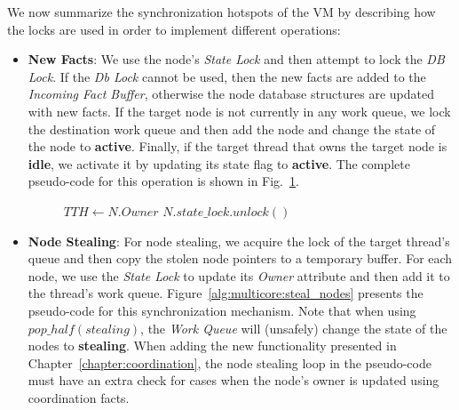 
We now summarize the synchronization hotspots of the VM by describing how the locks
are used in order to implement different operations:

\begin{itemize}

   \item \textbf{New Facts}: We use the node's \emph{State Lock} and then attempt
      to lock the \emph{DB Lock}. If the \emph{Db Lock} cannot be used, then the
      new facts are added to the \emph{Incoming Fact Buffer}, otherwise the node database
      structures are updated with new facts. If the target node is not currently
      in any work queue, we lock the destination work queue and then add the
      node and change the state of the node to \textbf{active}. Finally, if the
      target thread that owns the target node is \textbf{idle}, we activate it
      by updating its state flag to \textbf{active}. The complete pseudo-code
      for this operation is shown in Fig.~\ref{alg:multicore:new_fact}.

\begin{figure}
\begin{algorithm}[H]
   $TTH \longleftarrow N.Owner$\;
   $N.state\_lock.unlock()$\;
\end{algorithm}
 \label{alg:multicore:new_fact}
\end{figure}


   \item \textbf{Node Stealing}: For node stealing, we acquire the lock of the
      target thread's queue and then copy the stolen node pointers to a
      temporary buffer. For each node, we use the \emph{State Lock} to update its
      \emph{Owner} attribute and then add it to the thread's work queue.
      Figure~\ref{alg:multicore:steal_nodes} presents the pseudo-code for this
      synchronization mechanism. Note that when using $pop\_half(stealing)$, the
      \emph{Work Queue} will (unsafely) change the state of the nodes to
      \textbf{stealing}. When adding the new functionality presented in
      Chapter~\ref{chapter:coordination}, the node stealing loop in the
      pseudo-code must have an extra check for cases when the node's owner
      is updated using coordination facts.


\end{itemize}
